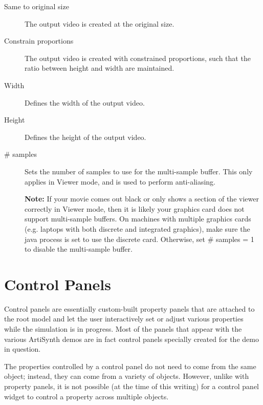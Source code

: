 \documentclass{article}
\begin{document}
\begin{description}

\item[Same to original size]\mbox{}

The output video is created at the original size.

\item[Constrain proportions]\mbox{}

The output video is created with constrained proportions, such that the ratio
between height and width are maintained.

\item[Width]\mbox{}

Defines the width of the output video. 

\item[Height]\mbox{}

Defines the height of the output video. 

\item[\# samples]\mbox{}

Sets the number of samples to use for the multi-sample buffer.  This only
applies in {\sf Viewer} mode, and is used to perform anti-aliasing.

\begin{sideblock}
{\bf Note:} If your movie comes out black or only shows a section of 
the viewer correctly in {\sf Viewer} mode, then it is likely your
graphics card does not support multi-sample buffers.  On machines 
with multiple graphics cards (e.g. laptops with both discrete and
integrated graphics), make sure the java process is set to use
the discrete card.  Otherwise, set {\sf \# samples = 1} to disable
the multi-sample buffer.
\end{sideblock}

\end{description}

\section{Control Panels}

Control panels are essentially custom-built property panels that are
attached to the root model and let the user interactively set or
adjust various properties while the simulation is in progress.
Most of the panels that appear with the various ArtiSynth demos
are in fact control panels specially created for the demo in question.

The properties controlled by a control panel do not need to come from
the same object; instead, they can come from a variety of objects.
However, unlike with property panels, it is not possible (at the time
of this writing) for a control panel widget to control a property across
multiple objects.
\end{document}
